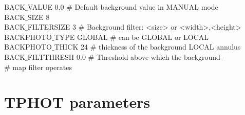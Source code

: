 \begin{tt}
BACK$\_$VALUE       0.0            $\#$ Default background value in MANUAL mode\\
BACK$\_$SIZE        8\\
BACK$\_$FILTERSIZE  3              $\#$ Background filter: <size> or <width>,<height>\\
BACKPHOTO$\_$TYPE   GLOBAL         $\#$ can be GLOBAL or LOCAL\\
BACKPHOTO$\_$THICK  24             $\#$ thickness of the background LOCAL annulus\\
BACK$\_$FILTTHRESH  0.0            $\#$ Threshold above which the background-\\
                                $\#$ map filter operates\\
  \end{tt}


\section{TPHOT parameters}
\label{sec:tphot}
